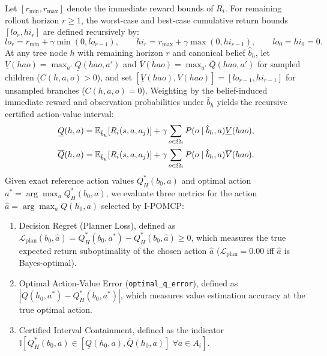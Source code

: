 \begin{definition}
  \sloppy Let $[r_{\min}, r_{\max}]$ denote the immediate reward bounds of $R_i$. For remaining rollout horizon $r \ge 1$, the worst-case and best-case cumulative return bounds $[lo_r, hi_r]$ are defined recursively by:
  \begin{equation}
    lo_r = r_{\min} + \gamma \min(0, lo_{r-1}), \qquad hi_r = r_{\max} + \gamma \max(0, hi_{r-1}), \qquad lo_0 = hi_0 = 0.
    \label{eq:certified_bounds}
  \end{equation}
  At any tree node $h$ with remaining horizon $r$ and canonical belief $\hat{b}_h$, let $\underline{V}(hao) = \max_{a'} \underline{Q}(hao, a')$ and $\overline{V}(hao) = \max_{a'} \overline{Q}(hao, a')$ for sampled children ($C(h,a,o) > 0$), and set $[\underline{V}(hao), \overline{V}(hao)] = [lo_{r-1}, hi_{r-1}]$ for unsampled branches ($C(h,a,o)=0$). Weighting by the belief-induced immediate reward and observation probabilities under $\hat{b}_h$ yields the recursive certified action-value interval:
  \begin{equation}
    \begin{aligned}
      \underline{Q}(h, a) &= \mathbb{E}_{\hat{b}_h}[R_i(s, a, a_j)] + \gamma \sum_{o \in \Omega_i} P(o \mid \hat{b}_h, a) \underline{V}(hao), \\
      \overline{Q}(h, a) &= \mathbb{E}_{\hat{b}_h}[R_i(s, a, a_j)] + \gamma \sum_{o \in \Omega_i} P(o \mid \hat{b}_h, a) \overline{V}(hao).
    \end{aligned}
    \label{eq:interval_backup}
  \end{equation}
  Given exact reference action values $Q_H^*(b_0, a)$ and optimal action $a^* = \arg\max_a Q_H^*(b_0, a)$, we evaluate three metrics for the action $\hat{a} = \arg\max_a Q(h_0, a)$ selected by I-POMCP:
  \begin{enumerate}
    \item Decision Regret (Planner Loss), defined as $\mathcal{L}_{\mathrm{plan}}(b_0, \hat{a}) = Q_H^*(b_0, a^*) - Q_H^*(b_0, \hat{a}) \ge 0$, which measures the true expected return suboptimality of the chosen action $\hat{a}$ ($\mathcal{L}_{\mathrm{plan}} = 0.00$ iff $\hat{a}$ is Bayes-optimal).
    \item Optimal Action-Value Error (\texttt{optimal\_q\_error}), defined as $|Q(h_0, a^*) - Q_H^*(b_0, a^*)|$, which measures value estimation accuracy at the true optimal action.
    \item Certified Interval Containment, defined as the indicator $\mathbb{I}[Q_H^*(b_0, a) \in [\underline{Q}(h_0, a), \overline{Q}(h_0, a)] \;\forall a \in A_i]$.
  \end{enumerate}
  \label{def:metrics}
\end{definition}

